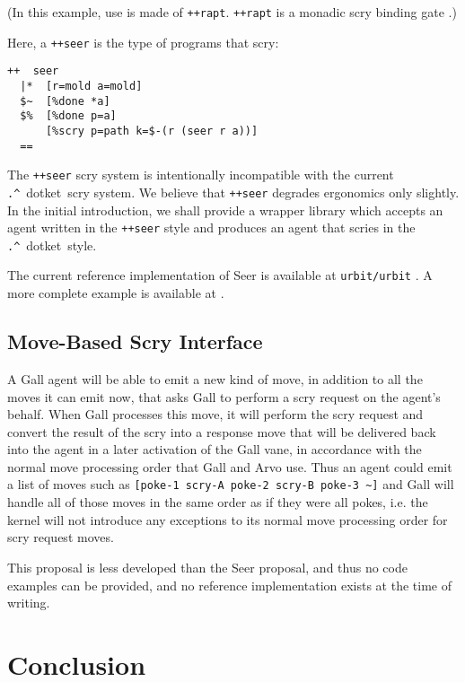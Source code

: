 \documentclass[twoside]{article}
\newcommand{\dotket}{\lstinline[style=inlinecode]{.^}~dotket}
\begin{document}
\noindent
(In this example, use is made of \lstinline[style=inlinecode]{++rapt}.  \lstinline[style=inlinecode]{++rapt} is a monadic scry binding gate \citep{Levan2023b}.)

Here, a \lstinline[style=inlinecode]{++seer} is the type of programs that scry:

\begin{lstlisting}[style=listingcode]
++  seer
  |*  [r=mold a=mold]
  $~  [%done *a]
  $%  [%done p=a]
      [%scry p=path k=$-(r (seer r a))]
  ==
\end{lstlisting}

The \lstinline[style=inlinecode]{++seer} scry system is intentionally incompatible with the current \dotket~scry system.  We believe that \lstinline[style=inlinecode]{++seer} degrades ergonomics only slightly.  In the initial introduction, we shall provide a wrapper library which accepts an agent written in the \lstinline[style=inlinecode]{++seer} style and produces an agent that scries in the \dotket~style.

The current reference implementation of Seer is available at \texttt{urbit/urbit} .  A more complete example is available at \citealt{Levan2023a}.

\subsection{Move-Based Scry Interface}

A Gall agent will be able to emit a new kind of move, in addition to all the moves it can emit now, that asks Gall to perform a scry request on the agent's behalf.  When Gall processes this move, it will perform the scry request and convert the result of the scry into a response move that will be delivered back into the agent in a later activation of the Gall vane, in accordance with the normal move processing order that Gall and Arvo use.  Thus an agent could emit a list of moves such as \lstinline[style=inlinecode]{[poke-1 scry-A poke-2 scry-B poke-3 ~]} and Gall will handle all of those moves in the same order as if they were all pokes, i.e. the kernel will not introduce any exceptions to its normal move processing order for scry request moves.

This proposal is less developed than the Seer proposal, and thus no code examples can be provided, and no reference implementation exists at the time of writing.


\section{Conclusion}
\end{document}
